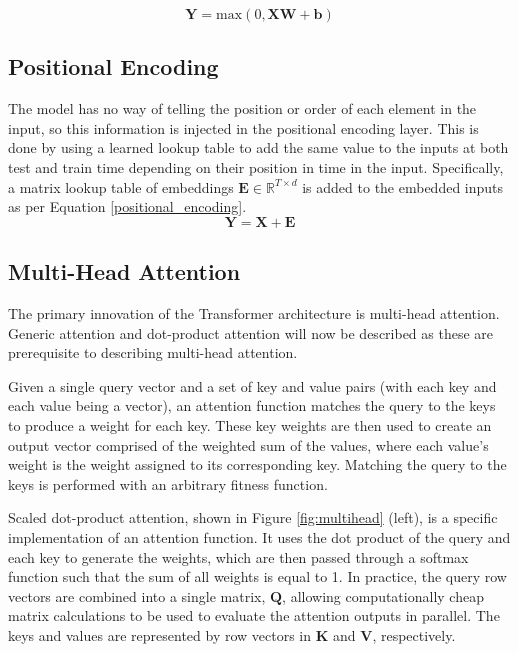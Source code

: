 \documentclass[conference]{IEEEtran}
\begin{document}
\begin{equation} \label{dense_layer}
\boldsymbol{Y} = \text{max}(0, \boldsymbol{XW} + \boldsymbol{b})
\end{equation}

\subsection{Positional Encoding}
The model has no way of telling the position or order of each element in the input, so this information is injected in the positional encoding layer.
This is done by using a learned lookup table to add the same value to the inputs at both test and train time depending on their position in time in the input.
Specifically, a matrix lookup table of embeddings $\boldsymbol{E} \in \mathbb{R}^{T \times d}$ is added to the embedded inputs as per Equation \ref{positional_encoding}.
\begin{equation}\label{positional_encoding}
\boldsymbol{Y} = \boldsymbol{X} + \boldsymbol{E}
\end{equation}

\subsection{Multi-Head Attention} \label{multihead_attention}
The primary innovation of the Transformer architecture is multi-head attention.
Generic attention and dot-product attention will now be described as these are prerequisite to describing multi-head attention.

Given a single query vector and a set of key and value pairs (with each key and each value being a vector), an attention function matches the query to the keys to produce a weight for each key.
These key weights are then used to create an output vector comprised of the weighted sum of the values, where each value's weight is the weight assigned to its corresponding key. 
Matching the query to the keys is performed with an arbitrary fitness function.

Scaled dot-product attention, shown in Figure \ref{fig:multihead} (left), is a specific implementation of an attention function. 
It uses the dot product of the query and each key to generate the weights, which are then passed through a softmax function such that the sum of all weights is equal to 1.
In practice, the query row vectors are combined into a single matrix, $\boldsymbol{Q}$, allowing computationally cheap matrix calculations to be used to evaluate the attention outputs in parallel.
The keys and values are represented by row vectors in $\boldsymbol{K}$ and $\boldsymbol{V}$, respectively.
\end{document}
